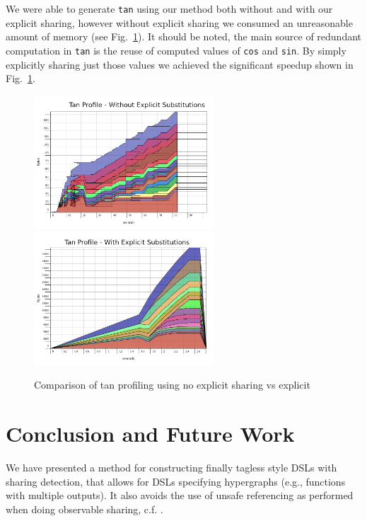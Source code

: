 \documentclass[runningheads]{llncs}
\begin{document}
We were able to generate \texttt{tan} using our method both without and with our explicit
sharing, however without explicit sharing we consumed an unreasonable amount of
memory (see Fig.~\ref{fig:explicitvsno}). It should be noted, the main source of
redundant computation in \texttt{tan} is the reuse of computed values of
\texttt{cos} and \texttt{sin}. By simply explicitly
sharing just those values we achieved the significant speedup shown in
Fig.~\ref{fig:explicitvsno}.

\begin{figure}[!h]
  \centering
  \includegraphics[width=0.6\textwidth]{figs/noexplicit_cropped.png}
  \hfill
  \includegraphics[width=0.6\textwidth]{figs/explicit_cropped.png}
  \caption{Comparison of tan profiling using no explicit sharing vs explicit}
  \label{fig:explicitvsno}
\end{figure}

\section{Conclusion and Future Work}
We have presented a method for constructing finally tagless style DSLs with
sharing detection, that allows for DSLs specifying hypergraphs (e.g., functions
with multiple outputs). It also avoids the use of unsafe referencing as
performed when doing observable sharing, c.f. \cite{gill:observablesharing}.
\end{document}
